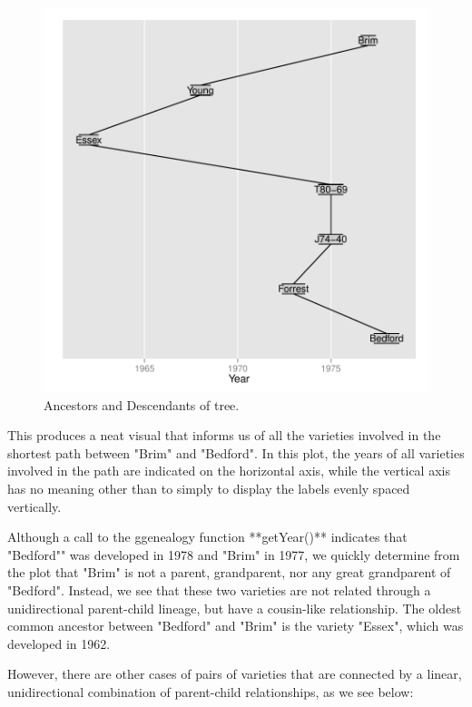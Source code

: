 \documentclass{article}
\numberwithin{equation}{section} %
\begin{document}
\begin{figure} 
  \begin{center} 
\includegraphics{ggenealogy-plotPath1}
\end{center} 
\caption{Ancestors and Descendants of tree.}
\label{fig:plotPath1}
\end{figure}

This produces a neat visual that informs us of all the varieties involved in the shortest path between "Brim" and "Bedford". In this plot, the years of all varieties involved in the path are indicated on the horizontal axis, while the vertical axis has no meaning other than to simply to display the labels evenly spaced vertically. 

Although a call to the ggenealogy function **getYear()** indicates that "Bedford"" was developed in 1978 and "Brim" in 1977, we quickly determine from the plot that "Brim" is not a parent, grandparent, nor any great grandparent of "Bedford". Instead, we see that these two varieties are not related through a unidirectional parent-child lineage, but have a cousin-like relationship. The oldest common ancestor between "Bedford" and "Brim" is the variety "Essex", which was developed in 1962.

However, there are other cases of pairs of varieties that are connected by a linear, unidirectional combination of parent-child relationships, as we see below:
\end{document}
